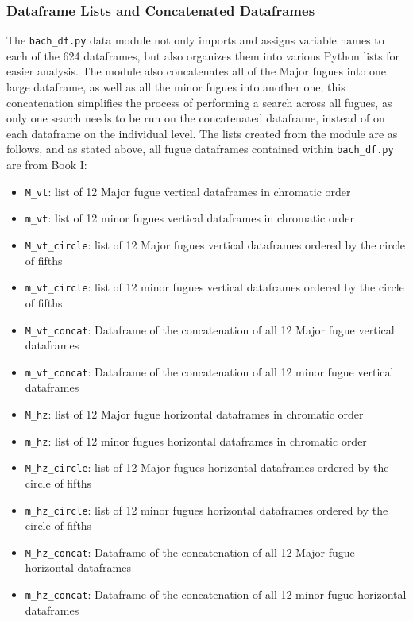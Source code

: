     \subsubsection{Dataframe Lists and Concatenated
Dataframes}\label{dataframe-lists-and-concatenated-dataframes}

The \texttt{bach\_df.py} data module not only imports and assigns
variable names to each of the 624 dataframes, but also organizes them
into various Python lists for easier analysis. The module also
concatenates all of the Major fugues into one large dataframe, as well
as all the minor fugues into another one; this concatenation simplifies
the process of performing a search across all fugues, as only one search
needs to be run on the concatenated dataframe, instead of on each
dataframe on the individual level. The lists created from the module are
as follows, and as stated above, all fugue dataframes contained within
\texttt{bach\_df.py} are from Book I:

\begin{itemize}
\tightlist
\item
  \texttt{M\_vt}: list of 12 Major fugue vertical dataframes in
  chromatic order
\item
  \texttt{m\_vt}: list of 12 minor fugues vertical dataframes in
  chromatic order
\item
  \texttt{M\_vt\_circle}: list of 12 Major fugues vertical dataframes
  ordered by the circle of fifths
\item
  \texttt{m\_vt\_circle}: list of 12 minor fugues vertical dataframes
  ordered by the circle of fifths
\item
  \texttt{M\_vt\_concat}: Dataframe of the concatenation of all 12 Major
  fugue vertical dataframes
\item
  \texttt{m\_vt\_concat}: Dataframe of the concatenation of all 12 minor
  fugue vertical dataframes 
\item
  \texttt{M\_hz}: list of 12 Major fugue horizontal dataframes in
  chromatic order
\item
  \texttt{m\_hz}: list of 12 minor fugues horizontal dataframes in
  chromatic order
\item
  \texttt{M\_hz\_circle}: list of 12 Major fugues horizontal dataframes
  ordered by the circle of fifths
\item
  \texttt{m\_hz\_circle}: list of 12 minor fugues horizontal dataframes
  ordered by the circle of fifths
\item
  \texttt{M\_hz\_concat}: Dataframe of the concatenation of all 12 Major
  fugue horizontal dataframes
\item
  \texttt{m\_hz\_concat}: Dataframe of the concatenation of all 12 minor
  fugue horizontal dataframes
\end{itemize}

